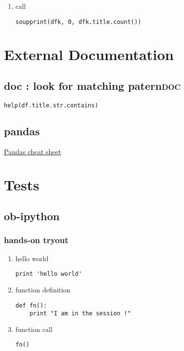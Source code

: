 \documentclass[11pt]{article}
\begin{document}
\begin{enumerate}
\begin{enumerate}
\begin{verbatim}
def souper(html):
    soup = BeautifulSoup(html, 'html.parser')
    print(soup.get_text())

def soupprint(df, begin, end):
    for i in range(begin, end):
	print(i, df.title.iloc[i])
	print("\n")
	print(df.company.iloc[i])
	print("\n")
	souper(df.desc.iloc[i])
	print("\n"*3)
	print("-"*100)
	print("\n"*3)
\end{verbatim}

\item call
\label{sec:org04d78bc}
\begin{verbatim}
soupprint(dfk, 0, dfk.title.count())
\end{verbatim}
\end{enumerate}
\end{enumerate}
\section{External Documentation}
\label{sec:org5f715ff}
\subsection{doc : look for matching patern\hfill{}\textsc{doc}}
\label{sec:org8f7419f}
\begin{verbatim}
help(df.title.str.contains)
\end{verbatim}

\subsection{pandas}
\label{sec:orgddfcd81}
\href{file:///home/teddd/Cours/Data/cheat-sheets/Pandas\_Cheat\_Sheet.pdf}{Pandas cheat sheet}
\section{Tests}
\label{sec:org9e1bc7d}
\subsection{ob-ipython}
\label{sec:orgd42efab}
\subsubsection{hands-on tryout}
\label{sec:orgf05595b}
\begin{enumerate}
\item hello world
\label{sec:org5ff9fa4}
\begin{verbatim}
print 'hello world'
\end{verbatim}
\item function definition
\label{sec:org3b3c914}
\begin{verbatim}
def fn():
    print "I am in the session !"
\end{verbatim}

\item function call
\label{sec:orgc553fae}
\begin{verbatim}
fn()
\end{verbatim}
\end{enumerate}
\end{document}
